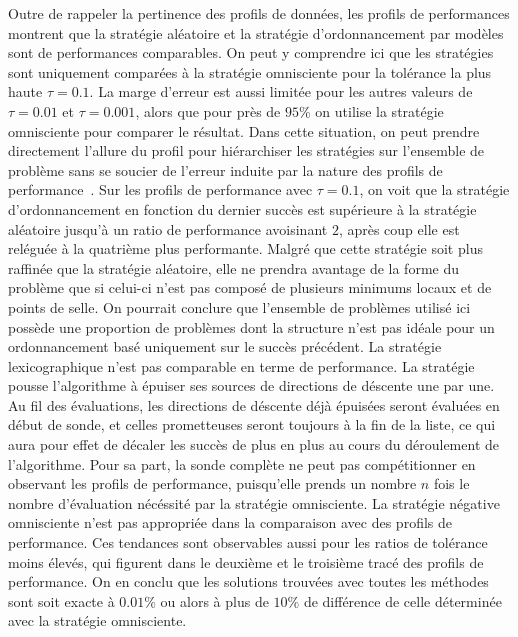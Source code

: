 Outre de rappeler la pertinence des profils de données, les profils de performances montrent que la stratégie aléatoire et la stratégie d'ordonnancement par modèles sont de performances comparables. On peut y comprendre ici que les stratégies sont uniquement comparées à la stratégie omnisciente pour la tolérance la plus haute $\tau = 0.1$. La marge d'erreur est aussi limitée pour les autres valeurs de $\tau = 0.01$ et $\tau = 0.001$, alors que pour près de $95\%$ on utilise la stratégie omnisciente pour comparer le résultat. Dans cette situation, on peut prendre directement l'allure du profil pour hiérarchiser les stratégies sur l'ensemble de problème sans se soucier de l'erreur induite par la nature des profils de performance~\cite{GoSc2016}. Sur les profils de performance avec $\tau = 0.1$, on voit que la stratégie d'ordonnancement en fonction du dernier succès est supérieure à la stratégie aléatoire jusqu'à un ratio de performance avoisinant $2$, après coup elle est reléguée à la quatrième plus performante. Malgré que cette stratégie soit plus raffinée que la stratégie aléatoire, elle ne prendra avantage de la forme du problème que si celui-ci n'est pas composé de plusieurs minimums locaux et de points de selle. On pourrait conclure que l'ensemble de problèmes utilisé ici possède une proportion de problèmes dont la structure n'est pas idéale pour un ordonnancement basé uniquement sur le succès précédent. La stratégie lexicographique n'est pas comparable en terme de performance. La stratégie pousse l'algorithme à épuiser ses sources de directions de déscente une par une. Au fil des évaluations, les directions de déscente déjà épuisées seront évaluées en début de sonde, et celles prometteuses seront toujours à la fin de la liste, ce qui aura pour effet de décaler les succès de plus en plus au cours du déroulement de l'algorithme. Pour sa part, la sonde complète ne peut pas compétitionner en observant les profils de performance, puisqu'elle prends un nombre $n$ fois le nombre d'évaluation nécéssité par la stratégie omnisciente. La stratégie négative omnisciente n'est pas appropriée dans la comparaison avec des profils de performance. Ces tendances sont observables aussi pour les ratios de tolérance moins élevés, qui figurent dans le deuxième et le troisième tracé des profils de performance. On en conclu que les solutions trouvées avec toutes les méthodes sont soit exacte à $0.01\%$ ou alors à plus de $10\%$ de différence de celle déterminée avec la stratégie omnisciente.

